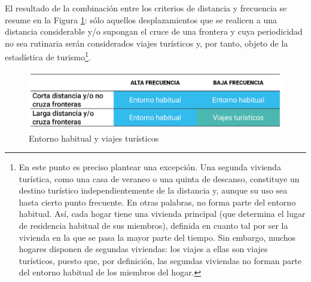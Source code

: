 \documentclass[
]{book}
\begin{document}
El resultado de la combinación entre los criterios de distancia y frecuencia se resume en la Figura \ref{fig:entornoYviajes}: sólo aquellos desplazamientos que se realicen a una distancia considerable y/o supongan el cruce de una frontera y cuya periodicidad no sea rutinaria serán considerados viajes turísticos y, por tanto, objeto de la estadística de turismo\footnote{En este punto es preciso plantear una excepción. Una segunda vivienda turística, como una casa de veraneo o una quinta de descanso, constituye un destino turístico independientemente de la distancia y, aunque su uso sea hasta cierto punto frecuente. En otras palabras, no forma parte del entorno habitual. Así, cada hogar tiene una vivienda principal (que determina el lugar de residencia habitual de sus miembros), definida en cuanto tal por ser la vivienda en la que se pasa la mayor parte del tiempo. Sin embargo, muchos hogares disponen de segundas viviendas: los viajes a ellas son viajes turísticos, puesto que, por definición, las segundas viviendas no forman parte del entorno habitual de los miembros del hogar.}.

\begin{figure}

{\centering \includegraphics[width=0.8\linewidth]{imagenes/figura1.1} 

}

\caption{Entorno habitual y viajes turísticos}\label{fig:entornoYviajes}
\end{figure}
\end{document}
